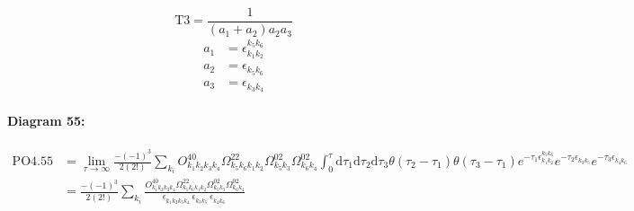 \documentclass[10pt,a4paper]{article}
\begin{document}
\begin{equation}
\text{T}3 = \frac{1}{(a_1+ a_2)a_2a_3}\end{equation}
\begin{align*}
a_1 &= \epsilon^{k_{5}k_{6}}_{k_{1}k_{2}}\\
a_2 &= \epsilon^{}_{k_{5}k_{6}}\\
a_3 &= \epsilon^{}_{k_{3}k_{4}}
\end{align*}
\paragraph{Diagram 55:}
\begin{align}
\text{PO}4.55
&= \lim\limits_{\tau \to \infty}\frac{-(-1)^3 }{2(2!)}\sum_{k_i}O^{40}_{k_{1}k_{2}k_{3}k_{4}} \Omega^{22}_{k_{5}k_{6}k_{1}k_{2}} \Omega^{02}_{k_{5}k_{3}} \Omega^{02}_{k_{6}k_{4}} \int_{0}^{\tau}\mathrm{d}\tau_1\mathrm{d}\tau_2\mathrm{d}\tau_3\theta(\tau_2-\tau_1) \theta(\tau_3-\tau_1) e^{-\tau_1 \epsilon^{k_{5}k_{6}}_{k_{1}k_{2}}}e^{-\tau_2 \epsilon^{}_{k_{3}k_{5}}}e^{-\tau_3 \epsilon^{}_{k_{4}k_{6}}}
 \nonumber \\
&= \frac{-(-1)^3 }{2(2!)}\sum_{k_i}\frac{O^{40}_{k_{1}k_{2}k_{3}k_{4}} \Omega^{22}_{k_{5}k_{6}k_{1}k_{2}} \Omega^{02}_{k_{5}k_{3}} \Omega^{02}_{k_{6}k_{4}} }{\epsilon^{}_{k_{1}k_{2}k_{3}k_{4}}\ \epsilon^{}_{k_{3}k_{5}}\ \epsilon^{}_{k_{4}k_{6}}\ } 
\end{align}
\end{document}
